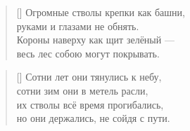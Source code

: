 \documentclass[a5paper,11pt]{memoir}
\begin{document}
\vspace{7cm}
\begin{verse}[\versewidth]
	\hspace{-3cm}Огромные стволы крепки как башни,\\
	\hspace{-3cm}руками и глазами не обнять.\\
	\hspace{-3cm}Короны наверху как щит зелёный ---\\
	\hspace{-3cm}весь лес собою могут покрывать.
\end{verse}

\begin{verse}[\versewidth]
	\hspace{-3cm}Сотни лет они тянулись к небу,\\
	\hspace{-3cm}сотни зим они в метель расли,\\
	\hspace{-3cm}их стволы всё время прогибались,\\
	\hspace{-3cm}но они держались, не сойдя с пути.
\end{verse}


\BgThispage
\newpage
\end{document}
